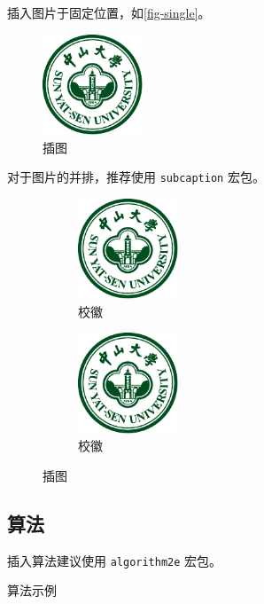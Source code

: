 插入图片于固定位置，如\autoref{fig-single}。
\begin{figure}[H]
    \centering
    \includegraphics[width=3cm]{figures/sysu-badge.pdf}
    \caption{插图}
    \label{fig-single}
\end{figure}

对于图片的并排，推荐使用 \verb|subcaption| 宏包。

\begin{figure}[H]
    \centering
    \begin{subfigure}{3cm}
        \centering
        \includegraphics[width=3cm]{figures/sysu-badge.pdf}
        \caption{校徽}
    \end{subfigure}
    \hspace{3cm}
    \begin{subfigure}{3cm}
        \centering
        \includegraphics[width=3cm]{figures/sysu-badge.pdf}
        \caption{校徽}
    \end{subfigure}
    \caption{插图}
    \label{fig-example}
\end{figure}

\subsection{算法}

插入算法建议使用 \verb|algorithm2e| 宏包。
\vspace{.5\baselineskip}

\begin{algorithm}[H]
    \caption{算法示例}
    \label{algo:algorithm1}
\end{algorithm}

